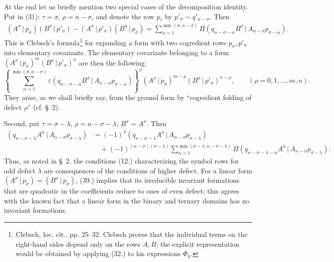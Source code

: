 \documentclass[11pt]{article}
\providecommand{\pair}[2]{(#1\,|\,#2)}
\providecommand{\eps}{\varepsilon}
\begin{document}
At the end let us briefly mention two special cases of the decomposition identity. Put in (31): $\tau=\sigma$, $\rho=n-\sigma$, and denote the row $p_\tau$ by $p'_\sigma\sim q'_{n-\sigma}$. Then
\begin{equation}
\begin{aligned}
\pair{A^\sigma}{p_\sigma}\pair{B^\sigma}{p'_\sigma}
-\pair{A^\sigma}{p'_\sigma}\pair{B^\sigma}{p_\sigma}
=\sum_{\alpha=1}^{\min(\sigma,n-\sigma)}
\Pi\pair{q_{n-\sigma-\alpha}B^\sigma}{A_{n-\sigma}p_{\sigma-\alpha}}.
\end{aligned}
\tag{37}
\end{equation}
This is Clebsch's formula\footnote{Clebsch, loc. cit., pp. 25--32. Clebsch proves that the individual terms on the right-hand sides depend only on the rows $A,B$; the explicit representation would be obtained by applying (32.) to his expressions $\Phi_h$.} for expanding a form with two cogredient rows $p_\sigma,p'_\sigma$ into elementary covariants. The elementary covariants belonging to a form $\pair{A^\sigma}{p_\sigma}^m\pair{B^\sigma}{p'_\sigma}^n$ are then the following:
\begin{equation}
 \left\{\sum_{\alpha=1}^{\min(\sigma,n-\sigma)}
 \eps\pair{q_{n-\sigma-\alpha}B^\sigma}{A_{n-\sigma}p_{\sigma-\alpha}}
 \right\}^{\rho}
 \pair{A^\sigma}{p_\sigma}^{m-\rho}\pair{B^\sigma}{p'_\sigma}^{n-\rho},
 \qquad (\rho=0,1,\ldots,m,n).
\tag{38}
\end{equation}
They arise, as we shall briefly say, from the ground form by ``cogredient folding of defect $\rho$'' (cf. \S\ 2).

Second, put $\tau=\sigma-\lambda$, $\rho=n-\sigma-\lambda$, $B^\sigma=A^\sigma$. Then
\begin{equation}
\begin{aligned}
\pair{q_{n-\sigma-\lambda}A^\sigma}{A_{n-\sigma}p_{\sigma-\lambda}}
&=(-1)^\lambda\pair{q_{n-\sigma-\lambda}A^\sigma}{A_{n-\sigma}p_{\sigma-\lambda}}\\
&\quad+(-1)^{(n-\sigma)(\sigma-\lambda)}
 \sum_{\alpha=1}^{\min(\sigma-\lambda,n-\sigma-\lambda)}
 \Pi\pair{q_{n-\sigma-\lambda-\alpha}A^\sigma}{A_{n-\sigma}p_{\sigma-\lambda}}.
\end{aligned}
\tag{39}
\end{equation}
Thus, as noted in \S\ 2, the conditions (12.) characterizing the symbol rows for odd defect $\lambda$ are consequences of the conditions of higher defect. For a linear form $\pair{A^\sigma}{p_\sigma}=\pair{B^\sigma}{p_\sigma}$, (39.) implies that its irreducible invariant formations that are quadratic in the coefficients reduce to ones of even defect; this agrees with the known fact that a linear form in the binary and ternary domains has no invariant formations.
\end{document}
